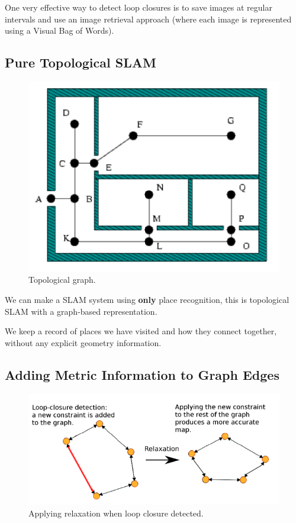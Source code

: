 \documentclass[11pt]{article}
\begin{document}
One very effective way to detect loop closures is to save images at regular intervals and use an image retrieval approach (where each image is represented using a Visual Bag of Words).

\subsection{Pure Topological SLAM}
\begin{figure}[h]
  \caption{Topological graph.}
  \includegraphics[scale=0.4]{toplogical}
  \centering
\end{figure}

We can make a SLAM system using \textbf{only} place recognition, this is topological SLAM with a graph-based representation.

We keep a record of places we have visited and how they connect together, without any explicit geometry information.

\subsection{Adding Metric Information to Graph Edges}
\begin{figure}[h]
  \caption{Applying relaxation when loop closure detected.}
  \includegraphics[scale=0.4]{relaxation}
  \centering
\end{figure}
\end{document}
